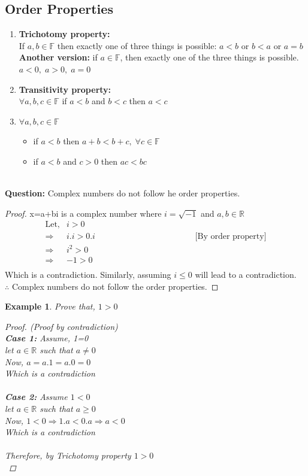 \documentclass{article}
\newtheorem{example}{Example}[section]
\newcommand{\Rw}{\Rightarrow}
\newcommand{\hs}{\hspace}
\begin{document}
\subsection{Order Properties}
\begin{enumerate}
    \item \textbf{Trichotomy property: } \\
If $a,b \in \mathbb{F}$ then exactly one of three things is possible: $a<b$ or $b<a$ or $a=b$\\
\textbf{Another version:} if $a\in \mathbb{F}$, then exactly one of the three things is possible. $a<0,\; a>0,\; a=0$
    \item \textbf{Transitivity property: }\\
$\forall a,b,c \in \mathbb{F} $ if $a<b$ and $b<c$ then $a<c$
\item $\forall a,b,c \in \mathbb{F}$
        \begin{itemize}
            \item if $a<b$ then $a+b<b+c,\;\forall c \in \mathbb{F}$ 
            \item if $a<b$ and $c>0$ then $ac<bc$\\\\
        \end{itemize}
\end{enumerate}
\textbf{Question: } Complex numbers do not follow he order properties.
\begin{proof}
    x=a+bi is a complex number where $i=\sqrt{-1}$ and $a,b \in \mathbb{R}$\\
    \begin{align*}
        \text{Let,} &i>0\\
        \Rw \;& i.i>0.i \hs{5cm}\text{[By order property]}\\
        \Rw \;& i^2>0\\
        \Rw & -1>0\\
    \end{align*}
    Which is a contradiction. Similarly, assuming $i\leq0$ will lead to a contradiction.\\
    $\therefore$ Complex numbers do not follow the order properties.
\end{proof}
\begin{example}
    Prove that, $1>0$
    \begin{proof}(Proof by contradiction)\\
        \textbf{Case 1:} Assume, 1=0\\
        let $a\in\mathbb{R}$ such that $a\neq 0$\\
        Now, $a=a.1=a.0=0$\\
        Which is a contradiction\\\\
        \textbf{Case 2: } Assume $1<0$\\
        let $a\in\mathbb{R}$ such that $a\geq 0$\\
        Now, $1<0 \Rw 1.a < 0.a \Rw a < 0$\\
        Which is a contradiction\\\\
        Therefore, by Trichotomy property $1>0$\\
    \end{proof}
\end{example}
\end{document}
